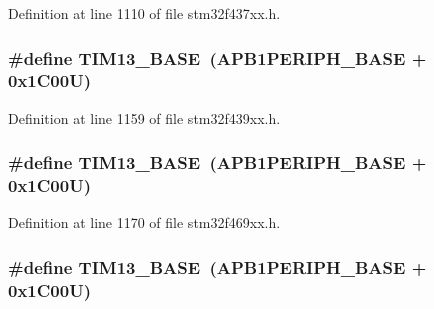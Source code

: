 Definition at line 1110 of file stm32f437xx.\+h.

\subsubsection[{\texorpdfstring{T\+I\+M13\+\_\+\+B\+A\+SE}{TIM13_BASE}}]{\setlength{\rightskip}{0pt plus 5cm}\#define T\+I\+M13\+\_\+\+B\+A\+SE~({\bf A\+P\+B1\+P\+E\+R\+I\+P\+H\+\_\+\+B\+A\+SE} + 0x1\+C00\+U)}\hypertarget{group___peripheral__memory__map_gad20f79948e9359125a40bbf6ed063590}{}\label{group___peripheral__memory__map_gad20f79948e9359125a40bbf6ed063590}


Definition at line 1159 of file stm32f439xx.\+h.

\subsubsection[{\texorpdfstring{T\+I\+M13\+\_\+\+B\+A\+SE}{TIM13_BASE}}]{\setlength{\rightskip}{0pt plus 5cm}\#define T\+I\+M13\+\_\+\+B\+A\+SE~({\bf A\+P\+B1\+P\+E\+R\+I\+P\+H\+\_\+\+B\+A\+SE} + 0x1\+C00\+U)}\hypertarget{group___peripheral__memory__map_gad20f79948e9359125a40bbf6ed063590}{}\label{group___peripheral__memory__map_gad20f79948e9359125a40bbf6ed063590}


Definition at line 1170 of file stm32f469xx.\+h.

\subsubsection[{\texorpdfstring{T\+I\+M13\+\_\+\+B\+A\+SE}{TIM13_BASE}}]{\setlength{\rightskip}{0pt plus 5cm}\#define T\+I\+M13\+\_\+\+B\+A\+SE~({\bf A\+P\+B1\+P\+E\+R\+I\+P\+H\+\_\+\+B\+A\+SE} + 0x1\+C00\+U)}\hypertarget{group___peripheral__memory__map_gad20f79948e9359125a40bbf6ed063590}{}\label{group___peripheral__memory__map_gad20f79948e9359125a40bbf6ed063590}


